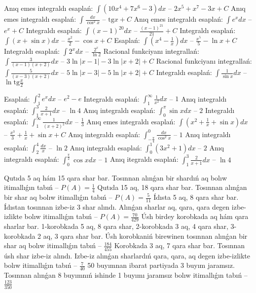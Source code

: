 Anıq emes integraldı esaplań: $\displaystyle\int \left( 10x^{4} + 7x^{6} - 3 \right)dx$ -- $2x^5+x^7-3x+C$
Anıq emes integraldı esaplań: $\displaystyle\int \frac{dx}{\cos^{2}x}$ -- $\text{tg} x+C$
Anıq emes integraldı esaplań: $\displaystyle\int e^{x}dx$ -- $e^x+C$
Integraldı esaplań: $\displaystyle\int (x - 1)^{20}dx$ -- $\frac{(x-1)^{21}}{21}+C$
Integraldı esaplań: $\displaystyle\int (x + \sin x)dx$ -- $\frac{x^2}{2} - \cos x +C$
Esaplań: $\displaystyle\int \left( x^{4}-\frac{1}{x} \right)dx$ -- $\frac{x^5}{5} - \ln x + C$
Integraldı esaplań: $\displaystyle\int {2^{x}dx}$ -- $\frac{2^x}{\ln 2}$
Racional funkciyanı integrallań: $\displaystyle\int {\frac{3}{(x - 1)(x + 2)}dx}$ -- $3\ln |x-1| - 3\ln |x+2| + C$
Racional funkciyanı integrallań: $\displaystyle\int {\frac{5}{(x - 3)(x + 2)}dx}$ -- $5\ln |x-3| - 5\ln |x+2| + C$
Integraldı esaplań: $\displaystyle\int {\frac{1}{\sin x}dx}$ -- $\ln \text{tg}\frac{x}{2}$

Esaplań: $\displaystyle\int_{1}^{2}{e^{x}dx}$ -- $e^2 - e$
Integraldı esaplań: $\displaystyle\int_{1}^{\infty}{\frac{1}{x^{2}}dx}$ -- $1$
Anıq integraldı esaplań: $\displaystyle\int_{1}^{3}{\frac{2}{x + 1}dx}$ -- $\ln 4$
Anıq integraldı esaplań: $\displaystyle\int_{0}^{\pi}\sin xdx$ -- $2$
Integraldı esaplań: $\displaystyle\int_{1}^{\infty}{\frac{1}{\left( x + 2 \right)^{2}}dx }$ -- $\frac{1}{3}$
Anıq emes integraldı esaplań: $\displaystyle\int(x^{2}+\frac{1}{x} + \sin x)dx$ -- $\frac{x^3}{3}+\frac{1}{x}+\sin x+C$
Anıq integraldı esaplań: $\displaystyle\int_{-\frac{\pi}{4}}^{0}\frac{dx}{\cos^{2}x}$ -- $1$
Anıq integraldı esaplań: $\displaystyle\int_{2}^{4}\frac{dx}{x}$ -- $\ln 2$
Anıq integraldı esaplań: $\displaystyle\int_{0}^{1}{(3x^{2} + 1)dx}$ -- $2$
Anıq integraldı esaplań: $\displaystyle\int_{0}^{\frac{\pi}{2}}\cos xdx$ -- $1$
Anıq itegraldı esaplań: $\displaystyle\int_{1}^{3}{\frac{2}{x + 1}dx}$ -- $\ln 4$

Qutıda 5 aq hám 15 qara shar bar. Tosınnan alınǵan bir shardıń aq bolıw itimallıǵın tabıń -- $P(A)=\frac{1}{4}$
Qutıda 15 aq, 18 qara shar bar. Tosınnan alınǵan bir shar aq bolıw itimallıǵın tabıń -- $P(A)=\frac{5}{11}$
Ídısta 5 aq, 8 qara shar bar. Ídıstan tosınnan izbe-iz 3 shar alındı. Alınǵan sharlar aq, qara, qara degen izbe-izlikte bolıw itimallıǵın tabıń -- $P(A)=\frac{70}{429}$
Úsh birdey korobkada aq hám qara sharlar bar. 1-korobkada 5 aq, 8 qara shar, 2-korobkada 3 aq, 4 qara shar, 3-korobkada 2 aq, 3 qara shar bar. Úsh korobkaniń birewinen tosınnan alınǵan bir shar aq bolıw itimallıǵın tabıń -- $\frac{184}{455}$
Korobkada 3 aq, 7 qara shar bar. Tosınnan úsh shar izbe-iz alındı. Izbe-iz alınǵan sharlardıń qara, qara, aq degen izbe-izlikte bolıw itimallıǵın tabıń -- $\frac{7}{40}$
50 buyımnan ibarat partiyada 3 buyım jaramsız. Tosınnan alınǵan 8 buyımnıń ishinde 1 buyımı jaramsız bolıw itimallıǵın tabıń -- $\frac{123}{350}$

